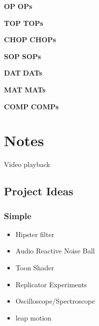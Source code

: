 
\def\boldcommandlist{\@elt OP,\@elt OPs,}
\def\@elt#1,{%
 \expandafter\def\csname#1\endcsname{\textbf{#1}\xspace}
}
\boldcommandlist

\def\topColorList{\@elt TOP,\@elt TOPs,}
\def\@elt#1,{%
 \expandafter\def\csname#1\endcsname{\textcolor{TOP}{\textbf{#1}}\xspace}
}
\topColorList

\def\chopColorList{\@elt CHOP,\@elt CHOPs,}
\def\@elt#1,{%
 \expandafter\def\csname#1\endcsname{\textcolor{CHOP}{\textbf{#1}}\xspace}
}
\chopColorList

\def\sopColorList{\@elt SOP,\@elt SOPs,}
\def\@elt#1,{%
 \expandafter\def\csname#1\endcsname{\textcolor{SOP}{\textbf{#1}}\xspace}
}
\sopColorList

\def\datColorList{\@elt DAT,\@elt DATs,}
\def\@elt#1,{%
 \expandafter\def\csname#1\endcsname{\textcolor{DAT}{\textbf{#1}}\xspace}
}
\datColorList

\def\matColorList{\@elt MAT,\@elt MATs,}
\def\@elt#1,{%
 \expandafter\def\csname#1\endcsname{\textcolor{MAT}{\textbf{#1}}\xspace}
}
\matColorList


\def\compColorList{\@elt COMP,\@elt COMPs,}
\def\@elt#1,{%
 \expandafter\def\csname#1\endcsname{\textcolor{COMP}{\textbf{#1}}\xspace}
}
\compColorList




\color{textStd}

\label{Notes}


\section{Notes} %
\label{notes}

Video playback

\subsection{Project Ideas}
\label{sub:ideen}
\subsubsection{Simple}
\begin{itemize}
	\item Hipster filter
	\item Audio Reactive Noise Ball
	\item Toon Shader
	\item Replicator Experiments
	\item Oscilloscope/Spectroscope
	\item leap motion
\end{itemize}

